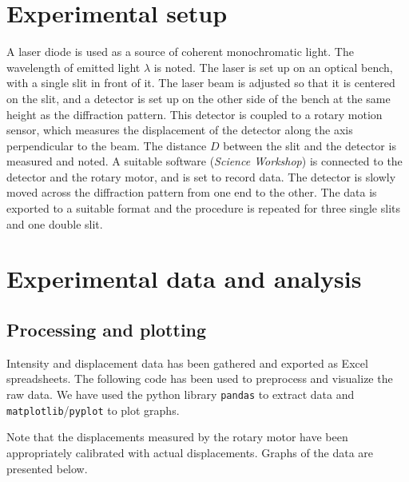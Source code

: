 \documentclass[11pt]{article}
\begin{document}
        \section{Experimental setup}
        A laser diode is used as a source of coherent monochromatic light. The wavelength of emitted light $\lambda$ is noted.
        The laser is set up on an optical bench, with a single slit in front of it.
        The laser beam is adjusted so that it is centered on the slit, and a detector is set up on the other side of the bench at the
        same height as the diffraction pattern. This detector is coupled to a rotary motion sensor, which measures the displacement of
        the detector along the axis perpendicular to the beam.
        The distance $D$ between the slit and the detector is measured and noted.
        A suitable software (\textit{Science Workshop}) is connected to the detector and the rotary motor, and is set to record data.
        The detector is slowly moved across the diffraction pattern from one end to the other.
        The data is exported to a suitable format and the procedure is repeated for three single slits and one double slit.

        \section{Experimental data and analysis}
        \subsection{Processing and plotting}
        Intensity and displacement data has been gathered and exported as Excel spreadsheets.
        The following code has been used to preprocess and visualize the raw data.
        We have used the python library \texttt{pandas} to extract data and \texttt{matplotlib}/\texttt{pyplot} to plot graphs.
        
        

        Note that the displacements measured by the rotary motor have been appropriately calibrated with actual displacements.
        Graphs of the data are presented below.
\end{document}
